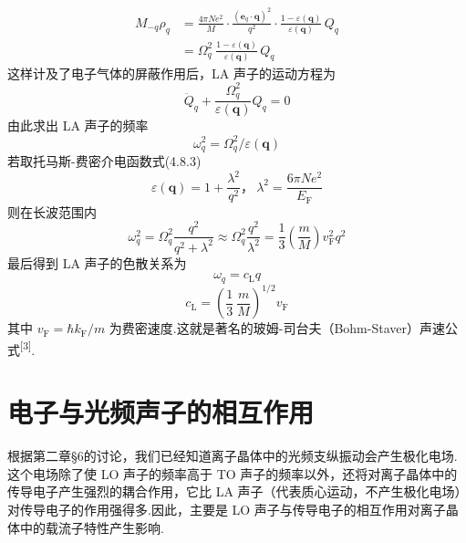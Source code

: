 \begin{equation}
\begin{aligned}
  M_{-q}\rho_q&=\frac{4\pi Ne^2}{M}\cdot\frac{\left(\boldsymbol{e}_q\cdot\boldsymbol{q}\right)^2}{q^2}
  \cdot\frac{1-\varepsilon\left(\boldsymbol{q}\right)}{\varepsilon\left(\boldsymbol{q}\right)}\,Q_q\\
  &=\Omega_q^2\ \frac{1-\varepsilon\left(\boldsymbol{q}\right)}{\varepsilon\left(\boldsymbol{q}\right)}\,Q_q
\end{aligned}
\end{equation}
这样计及了电子气体的屏蔽作用后，LA 声子的运动方程为
\begin{equation}
  \ddot{Q}_q+\frac{\Omega_q^2}{\varepsilon\left(\boldsymbol{q}\right)}Q_q=0
\end{equation}
由此求出 LA 声子的频率
\begin{equation}
  \omega_q^2=\Omega_q^2/\varepsilon\left(\boldsymbol{q}\right)
\end{equation}
若取托马斯-费密介电函数式(4.8.3)
\begin{equation}
  \varepsilon\left(\boldsymbol{q}\right)=1+\frac{\lambda^2}{q^2}
  \text{，}\ \lambda^2=\frac{6\pi Ne^2}{E_{\mathrm{F}}}
\end{equation}
则在长波范围内
\begin{equation}
  \omega_q^2=\Omega_q^2\frac{q^2}{q^2+\lambda^2}
  \approx\Omega_q^2\frac{q^2}{\lambda^2}
  =\frac{1}{3}\left(\frac{m}{M}\right)v_{\mathrm{F}}^2q^2
\end{equation}
最后得到 LA 声子的色散关系为
\begin{equation}
  \omega_q=c_{\mathrm{L}}q
\end{equation}
\begin{equation}
  c_{\mathrm{L}}=\left(\frac{1}{3}\ \frac{m}{M}\right)^{1/2}v_{\mathrm{F}}
\end{equation}
其中 $v_{\mathrm{F}}=\hbar k_{\mathrm{F}}/m$ 为费密速度.这就是著名的玻姆-司台夫（Bohm-Staver）声速公式\textsuperscript{[3]}.

\section{电子与光频声子的相互作用}

根据第二章§6的讨论，我们已经知道离子晶体中的光频支纵振动会产生极化电场.这个电场除了使 LO 声子的频率高于 TO 声子的频率以外，还将对离子晶体中的传导电子产生强烈的耦合作用，它比 LA 声子（代表质心运动，不产生极化电场）对传导电子的作用强得多.因此，主要是 LO 声子与传导电子的相互作用对离子晶体中的载流子特性产生影响.

